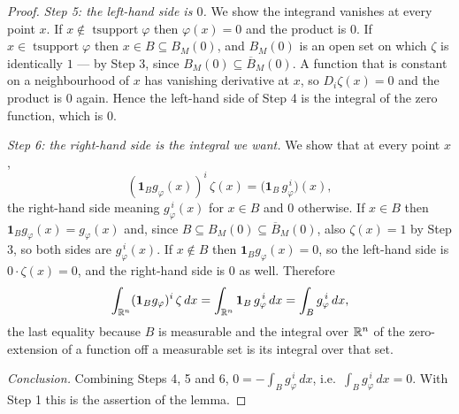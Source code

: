 \begin{proof}
\emph{Step 5: the left-hand side is $0$.}  We show the integrand vanishes at
every point $x$.  If $x\notin\operatorname{tsupport}\varphi$ then
$\varphi(x)=0$ and the product is $0$.  If
$x\in\operatorname{tsupport}\varphi$ then $x\in B\subseteq B_M(0)$, and $B_M(0)$
is an open set on which $\zeta$ is identically $1$ --- by Step 3, since
$B_M(0)\subseteq\overline B_M(0)$.  A function that is constant on a
neighbourhood of $x$ has vanishing derivative at $x$, so $D_i\zeta(x)=0$ and the
product is $0$ again.  Hence the left-hand side of Step 4 is the integral of the
zero function, which is $0$.

\emph{Step 6: the right-hand side is the integral we want.}  We show that at
every point $x$,
\[
(\mathbf1_Bg_\varphi(x))^i\,\zeta(x)
=\bigl(\mathbf1_B\,g_\varphi^{\,i}\bigr)(x) ,
\]
the right-hand side meaning $g_\varphi^{\,i}(x)$ for $x\in B$ and $0$ otherwise.
If $x\in B$ then $\mathbf1_Bg_\varphi(x)=g_\varphi(x)$ and, since
$B\subseteq B_M(0)\subseteq\overline B_M(0)$, also $\zeta(x)=1$ by Step 3, so
both sides are $g_\varphi^{\,i}(x)$.  If $x\notin B$ then
$\mathbf1_Bg_\varphi(x)=0$, so the left-hand side is $0\cdot\zeta(x)=0$, and the
right-hand side is $0$ as well.  Therefore
\[
\int_{\mathbb{R}^n}(\mathbf1_Bg_\varphi)^i\,\zeta\,dx
=\int_{\mathbb{R}^n}\mathbf1_B\,g_\varphi^{\,i}\,dx
=\int_Bg_\varphi^{\,i}\,dx ,
\]
the last equality because $B$ is measurable and the integral over $\mathbb{R}^n$ of the
zero-extension of a function off a measurable set is its integral over that set.

\emph{Conclusion.}  Combining Steps 4, 5 and 6,
$0=-\int_Bg_\varphi^{\,i}\,dx$, i.e.\ $\int_Bg_\varphi^{\,i}\,dx=0$.  With Step
1 this is the assertion of the lemma.
\end{proof}
